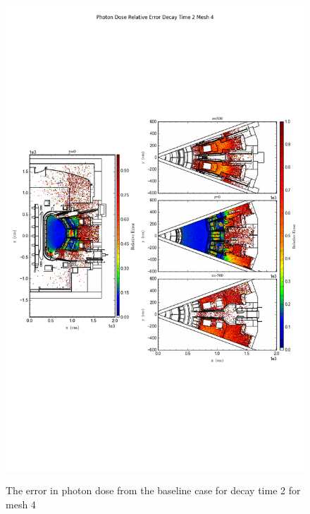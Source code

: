 \begin{figure}[ht!]
\centering
\includegraphics[trim={0cm 9cm 0cm 10cm},clip,scale=0.75]{../plots/final_model/Photon_Dose_Relative_Error_Decay_Time_2_Mesh_4.png}
\label{fig:photons_dc2_no4bc_m4_error}
\caption{The error in photon dose from the baseline case for decay time 2 for mesh 4}
\end{figure}
